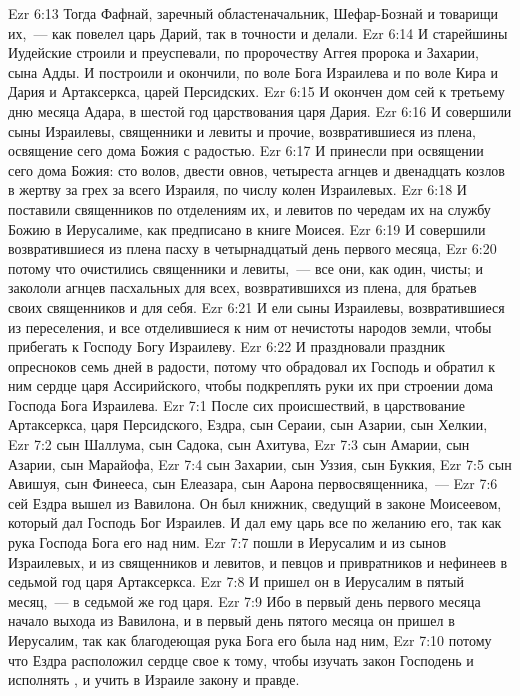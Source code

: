 \rsbpar\vs Ezr 6:13 Тогда Фафнай, заречный областеначальник, Шефар-Бознай и товарищи их,~--- как повелел царь Дарий, так в точности и делали.
\vs Ezr 6:14 И старейшины Иудейские строили и преуспевали, по пророчеству Аггея пророка и Захарии, сына Адды. И построили и окончили, по воле Бога Израилева и по воле Кира и Дария и Артаксеркса, царей Персидских.
\vs Ezr 6:15 И окончен дом сей к третьему дню месяца Адара, в шестой год царствования царя Дария.
\vs Ezr 6:16 И совершили сыны Израилевы, священники и левиты и прочие, возвратившиеся из плена, освящение сего дома Божия с радостью.
\vs Ezr 6:17 И принесли при освящении сего дома Божия: сто волов, двести овнов, четыреста агнцев и двенадцать козлов в жертву за грех за всего Израиля, по числу колен Израилевых.
\vs Ezr 6:18 И поставили священников по отделениям их, и левитов по чередам их на службу Божию в Иерусалиме, как предписано в книге Моисея.
\vs Ezr 6:19 И совершили возвратившиеся из плена пасху в четырнадцатый день первого месяца,
\vs Ezr 6:20 потому что очистились священники и левиты,~--- все они, как один,  чисты; и закололи агнцев пасхальных для всех, возвратившихся из плена, для братьев своих священников и для себя.
\vs Ezr 6:21 И ели сыны Израилевы, возвратившиеся из переселения, и все отделившиеся к ним от нечистоты народов земли, чтобы прибегать к Господу Богу Израилеву.
\vs Ezr 6:22 И праздновали праздник опресноков семь дней в радости, потому что обрадовал их Господь и обратил к ним сердце царя Ассирийского, чтобы подкреплять руки их при строении дома Господа Бога Израилева.
\vs Ezr 7:1 После сих происшествий, в царствование Артаксеркса, царя Персидского, Ездра, сын Сераии, сын Азарии, сын Хелкии,
\vs Ezr 7:2 сын Шаллума, сын Садока, сын Ахитува,
\vs Ezr 7:3 сын Амарии, сын Азарии, сын Марайофа,
\vs Ezr 7:4 сын Захарии, сын Уззия, сын Буккия,
\vs Ezr 7:5 сын Авишуя, сын Финееса, сын Елеазара, сын Аарона первосвященника,~---
\vs Ezr 7:6 сей Ездра вышел из Вавилона. Он был книжник, сведущий в законе Моисеевом, который дал Господь Бог Израилев. И дал ему царь все по желанию его, так как рука Господа Бога его  над ним.
\vs Ezr 7:7  пошли в Иерусалим и  из сынов Израилевых, и из священников и левитов, и певцов и привратников и нефинеев в седьмой год царя Артаксеркса.
\vs Ezr 7:8 И пришел он в Иерусалим в пятый месяц,~--- в седьмой же год царя.
\vs Ezr 7:9 Ибо в первый день первого месяца  начало выхода из Вавилона, и в первый день пятого месяца он пришел в Иерусалим, так как благодеющая рука Бога его была над ним,
\vs Ezr 7:10 потому что Ездра расположил сердце свое к тому, чтобы изучать закон Господень и исполнять , и учить в Израиле закону и правде.
